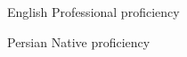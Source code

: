 
\begin{cvskills}

  \cvskill
    {English} %
    {Professional proficiency} %

  \cvskill
    {Persian} %
    {Native proficiency} %

\end{cvskills}
